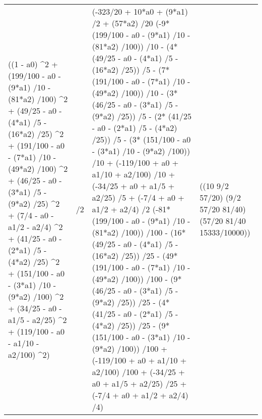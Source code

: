 \documentclass[11pt]{article}
\begin{document}
\begin{center}
\begin{tabular}{llll}
((1 - a0) \^{}2 + (199/100 - a0 - (9*a1) /10 - (81*a2) /100) \^{}2 + (49/25 - a0 - (4*a1) /5 - (16*a2) /25) \^{}2 + (191/100 - a0 - (7*a1) /10 - (49*a2) /100) \^{}2 + (46/25 - a0 - (3*a1) /5 - (9*a2) /25) \^{}2 + (7/4 - a0 - a1/2 - a2/4) \^{}2 + (41/25 - a0 - (2*a1) /5 - (4*a2) /25) \^{}2 + (151/100 - a0 - (3*a1) /10 - (9*a2) /100) \^{}2 + (34/25 - a0 - a1/5 - a2/25) \^{}2 + (119/100 - a0 - a1/10 - a2/100) \^{}2) & /2 & (-323/20 + 10*a0 + (9*a1) /2 + (57*a2) /20 (-9* (199/100 - a0 - (9*a1) /10 - (81*a2) /100)) /10 - (4* (49/25 - a0 - (4*a1) /5 - (16*a2) /25)) /5 - (7* (191/100 - a0 - (7*a1) /10 - (49*a2) /100)) /10 - (3* (46/25 - a0 - (3*a1) /5 - (9*a2) /25)) /5 - (2* (41/25 - a0 - (2*a1) /5 - (4*a2) /25)) /5 - (3* (151/100 - a0 - (3*a1) /10 - (9*a2) /100)) /10 + (-119/100 + a0 + a1/10 + a2/100) /10 + (-34/25 + a0 + a1/5 + a2/25) /5 + (-7/4 + a0 + a1/2 + a2/4) /2 (-81* (199/100 - a0 - (9*a1) /10 - (81*a2) /100)) /100 - (16* (49/25 - a0 - (4*a1) /5 - (16*a2) /25)) /25 - (49* (191/100 - a0 - (7*a1) /10 - (49*a2) /100)) /100 - (9* (46/25 - a0 - (3*a1) /5 - (9*a2) /25)) /25 - (4* (41/25 - a0 - (2*a1) /5 - (4*a2) /25)) /25 - (9* (151/100 - a0 - (3*a1) /10 - (9*a2) /100)) /100 + (-119/100 + a0 + a1/10 + a2/100) /100 + (-34/25 + a0 + a1/5 + a2/25) /25 + (-7/4 + a0 + a1/2 + a2/4) /4) & ((10 9/2 57/20) (9/2 57/20 81/40) (57/20 81/40 15333/10000))\\
\end{tabular}
\end{center}
\end{document}
